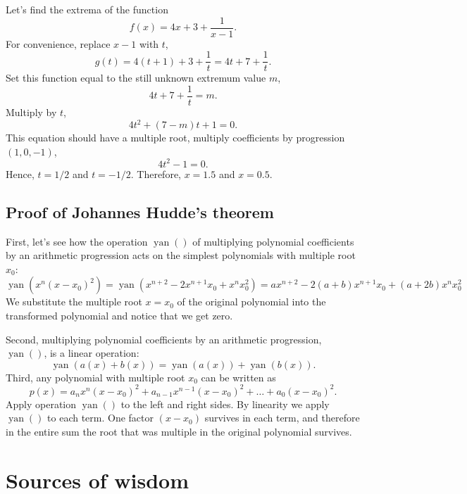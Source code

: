 \documentclass[12pt]{article}
\DeclareMathOperator{\yan}{yan}
\begin{document}
Let's find the extrema of the function 
\[
f(x) = 4x + 3 + \frac{1}{x - 1}.
\]
For convenience, replace $x - 1$ with $t$,
\[
g(t) = 4(t + 1) + 3 + \frac{1}{t} = 4t + 7 + \frac{1}{t}.
\]
Set this function equal to the still unknown extremum value $m$,
\[
4t + 7 + \frac{1}{t} = m.
\]
Multiply by $t$, 
\[
4t^2 + (7 - m) t + 1 = 0.
\]
This equation should have a multiple root, multiply coefficients by progression $(1, 0, -1)$,
\[
4t^2 - 1 = 0.
\]
Hence, $t = 1/2$ and $t = -1/2$.
Therefore, $x = 1.5$ and $x = 0.5$.


\subsection*{Proof of Johannes Hudde's theorem}

First, let's see how the operation $\yan()$ of multiplying polynomial coefficients by an arithmetic progression 
acts on the simplest polynomials with multiple root $x_0$:
\[
\yan(x^n(x - x_0)^2) = \yan(x^{n+2} - 2x^{n+1} x_0 + x^n x_0^2) = ax^{n+2} - 2(a + b)x^{n+1} x_0 + (a+2b)x^n x_0^2
\]
We substitute the multiple root $x = x_0$ of the original polynomial into the transformed polynomial and notice that we get zero. 

Second, multiplying polynomial coefficients by an arithmetic progression, $\yan()$, is a linear operation:
\[
\yan(a(x) + b(x)) = \yan(a(x)) + \yan(b(x)).
\]
Third, any polynomial with multiple root $x_0$ can be written as
\[
p(x) = a_n x^n (x - x_0)^2 + a_{n-1} x^{n-1}(x - x_0)^2 + \dots + a_0 (x - x_0)^2.
\]
Apply operation $\yan()$ to the left and right sides. 
By linearity we apply $\yan()$ to each term.
One factor $(x - x_0)$ survives in each term, and therefore in the entire sum the root that was multiple in the original polynomial survives.


\section*{Sources of wisdom}
\printbibliography[heading=none]
\end{document}
